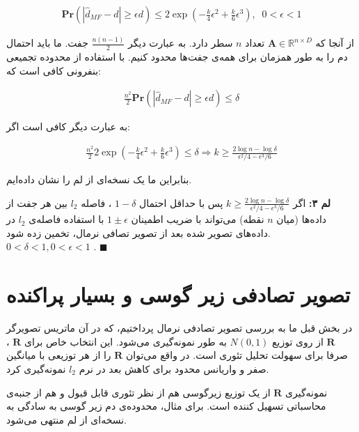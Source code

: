 \begin{align}
\mathbf{Pr} \left( \left| \hat{d}_{MF} - d \right| \geq \epsilon d \right) \leq 2 \exp \left( - \frac{k}{4} \epsilon^2 + \frac{k}{6} \epsilon^3 \right),\;\; 0 < \epsilon < 1
\label{eq:1iI}
\end{align}

از آنجا که 
$\mathbf{A} \in \mathbb{R}^{n \times D}$
تعداد 
$n$ 
سطر دارد. به عبارت دیگر 
$\frac{n(n-1)}{2}$
جفت. ما باید احتمال دم را به طور همزمان برای همه‌ی جفت‌ها محدود کنیم. با استفاده از محدوده تجمیعی بنفرونی
کافی است که:

\begin{align}
\frac{n^2}{2} \mathbf{Pr} \left( \left| \hat{d}_{MF} - d \right| \geq \epsilon d \right) \leq \delta
\label{eq:1iJ}
\end{align}

به عبارت دیگر کافی است اگر:

\begin{align}
\frac{n^2}{2} 2 \exp \left( - \frac{k}{4} \epsilon^2 + \frac{k}{6} \epsilon^3 \right) \leq \delta 
\Rightarrow
k \geq \frac{2 \log n - \log \delta}{\epsilon^2 / 4 - \epsilon^3 / 6}
\label{eq:1iK}
\end{align}

بنابراین ما یک نسخه‌ای از لم 
را نشان داده‌ایم.

\textbf{
لم ۳:
}
اگر 
$k \geq \frac{2 \log n - \log \delta}{\epsilon^2 / 4 - \epsilon^3 / 6} $
پس با حداقل احتمال 
$1-\delta$
، فاصله 
$l_2$
بین هر جفت از داده‌ها (میان 
$n$
نقطه) می‌تواند با ضریب اطمینان
$1 \pm \epsilon$
با استفاده فاصله‌ی 
$l_2$
در داده‌های تصویر شده بعد از تصویر تصافی نرمال، تخمین زده شود.
$0 < \delta < 1, 0 < \epsilon < 1$
.
$\blacksquare$
\bigskip



\section{
تصویر تصادفی زیر گوسی و بسیار پراکنده
}

در بخش قبل ما به بررسی تصویر تصادفی نرمال پرداختیم، که در آن ماتریس تصویرگر 
$\mathbf{R}$
از روی توزیع 
$N(0,1)$
به طور 
نمونه‌گیری می‌شود. این انتخاب خاص برای 
$\mathbf{R}$
، صرفا برای سهولت تحلیل تئوری است. در واقع می‌توان 
$\mathbf{R}$
را از هر توزیعی با میانگین صفر و واریانس محدود برای کاهش بعد در نرم 
$l_2$
نمونه‌گیری کرد.

نمونه‌گیری
$\mathbf{R}$
از یک توزیع زیرگوسی
هم از نظر تئوری قابل قبول و هم از جنبه‌ی محاسباتی تسهیل کننده است. برای مثال، محدوده‌ی دم زیر گوسی به سادگی به نسخه‌ای از لم
منتهی می‌شود. 

